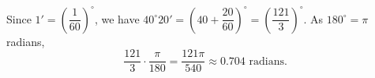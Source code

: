 Since $1'=\left(\dfrac{1}{60}\right)^\circ$, we have $40^\circ20'=\left(40+\dfrac{20}{60}\right)^\circ=\left(\dfrac{121}{3}\right)^\circ$. As $180^\circ=\pi$ radians,
\[
\dfrac{121}{3}\cdot\dfrac{\pi}{180}=\boxed{\dfrac{121\pi}{540}}\approx0.704\text{ radians}.
\]
